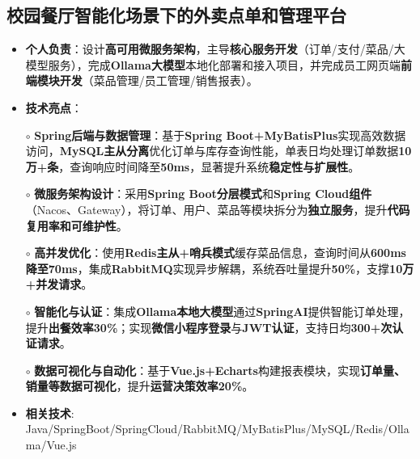 \subsection{\textbf{校园餐厅智能化场景下的外卖点单和管理平台} \hspace{2cm}{2025.01 -- 2025.04}}
    \begin{normalsize}
      \begin{itemize}
        \item \textbf{个人负责}：设计\textbf{高可用微服务架构}，主导\textbf{核心服务开发}（订单/支付/菜品/大模型服务），完成\textbf{Ollama大模型}本地化部署和接入项目，并完成员工网页端\textbf{前端模块开发}（菜品管理/员工管理/销售报表）。
        \item \textbf{技术亮点}：
        \setlength{\itemindent}{1em} %
          \item[$\circ$] \textbf{Spring后端与数据管理}：基于\textbf{Spring Boot+MyBatisPlus}实现高效数据访问，\textbf{MySQL主从分离}优化订单与库存查询性能，单表日均处理订单数据\textbf{10万+条}，查询响应时间降至\textbf{50ms}，显著提升系统\textbf{稳定性与扩展性}。
          \item[$\circ$] \textbf{微服务架构设计}：采用\textbf{Spring Boot分层模式}和\textbf{Spring Cloud组件}（Nacos、Gateway），将订单、用户、菜品等模块拆分为\textbf{独立服务}，提升\textbf{代码复用率和可维护性}。
          \item[$\circ$] \textbf{高并发优化}：使用\textbf{Redis主从+哨兵模式}缓存菜品信息，查询时间从\textbf{600ms降至70ms}，集成\textbf{RabbitMQ}实现异步解耦，系统吞吐量提升\textbf{50\%}，支撑\textbf{10万+并发请求}。
          \item[$\circ$] \textbf{智能化与认证}：集成\textbf{Ollama本地大模型}通过\textbf{SpringAI}提供智能订单处理，提升\textbf{出餐效率30\%}；实现\textbf{微信小程序登录}与\textbf{JWT认证}，支持日均\textbf{300+次认证请求}。
          \item[$\circ$] \textbf{数据可视化与自动化}：基于\textbf{Vue.js+Echarts}构建报表模块，实现\textbf{订单量、销量等数据可视化}，提升\textbf{运营决策效率20\%}。
        \setlength{\itemindent}{0em} %
        \item \textbf{相关技术}: Java/SpringBoot/SpringCloud/RabbitMQ/MyBatisPlus/MySQL/Redis/Ollama/Vue.js
        \end{itemize}
    \end{normalsize}